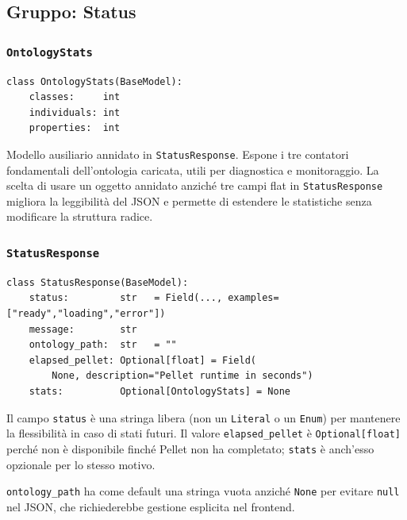 \documentclass[a4paper,12pt]{article}
\begin{document}
\subsection{Gruppo: Status}

\subsubsection{\texttt{OntologyStats}}

\begin{lstlisting}[caption={\texttt{OntologyStats} --- statistiche dell'ontologia.}]
class OntologyStats(BaseModel):
    classes:     int
    individuals: int
    properties:  int
\end{lstlisting}

\noindent Modello ausiliario annidato in \texttt{StatusResponse}. Espone i tre
contatori fondamentali dell'ontologia caricata, utili per diagnostica
e monitoraggio. La scelta di usare un oggetto annidato anzich\'{e} tre
campi flat in \texttt{StatusResponse} migliora la leggibilit\`{a} del
JSON e permette di estendere le statistiche senza modificare la struttura
radice.

\subsubsection{\texttt{StatusResponse}}

\begin{lstlisting}[caption={\texttt{StatusResponse} --- risposta di \texttt{GET /status}.}]
class StatusResponse(BaseModel):
    status:         str   = Field(..., examples=["ready","loading","error"])
    message:        str
    ontology_path:  str   = ""
    elapsed_pellet: Optional[float] = Field(
        None, description="Pellet runtime in seconds")
    stats:          Optional[OntologyStats] = None
\end{lstlisting}

\noindent Il campo \texttt{status} \`{e} una stringa libera (non un \texttt{Literal}
o un \texttt{Enum}) per mantenere la flessibilit\`{a} in caso di stati
futuri. Il valore \texttt{elapsed\_pellet} \`{e} \texttt{Optional[float]}
perch\'{e} non \`{e} disponibile finch\'{e} Pellet non ha completato;
\texttt{stats} \`{e} anch'esso opzionale per lo stesso motivo.

\texttt{ontology\_path} ha come default una stringa vuota anzich\'{e}
\texttt{None} per evitare \texttt{null} nel JSON, che richiederebbe
gestione esplicita nel frontend.
\end{document}
